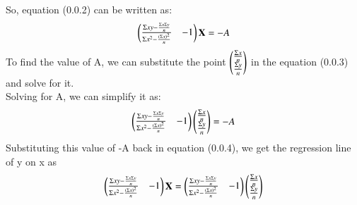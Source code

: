 \documentclass[journal,12pt,twocolumn]{IEEEtran}
\begin{document}
So, equation (0.0.2) can be written as:\\
\begin{align}
    \begin{pmatrix}\frac{\Sigma xy - \frac{\Sigma x \Sigma y}{n}}{\Sigma x^2 - \frac{(\Sigma x)^2}{n}} & -1\end{pmatrix}\mathbf{X} = -A
\end{align}
To find the value of A, we can substitute the point $ \begin{pmatrix}\frac{\Sigma x}{n} \\ \frac{\Sigma y}{n}\end{pmatrix}  $ in the equation (0.0.3) and solve for it.\\
Solving for A, we can simplify it as:\\
\begin{align}
    \begin{pmatrix}\frac{\Sigma xy - \frac{\Sigma x \Sigma y}{n}}{\Sigma x^2 - \frac{(\Sigma x)^2}{n}} & -1\end{pmatrix}\begin{pmatrix}\frac{\Sigma x}{n} \\ \frac{\Sigma y}{n}\end{pmatrix} = -A
\end{align}
Substituting this value of -A back in equation (0.0.4), we get the regression line of y on x as\\
\begin{align}
    \begin{pmatrix}\frac{\Sigma xy - \frac{\Sigma x \Sigma y}{n}}{\Sigma x^2 - \frac{(\Sigma x)^2}{n}} & -1\end{pmatrix}\mathbf{X} = \begin{pmatrix}\frac{\Sigma xy - \frac{\Sigma x \Sigma y}{n}}{\Sigma x^2 - \frac{(\Sigma x)^2}{n}} & -1\end{pmatrix}\begin{pmatrix}\frac{\Sigma x}{n} \\ \frac{\Sigma y}{n}\end{pmatrix}
\end{align}\\
\end{document}
